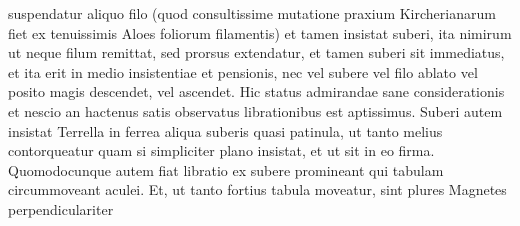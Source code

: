 suspendatur aliquo filo (quod consultissime mutatione praxium Kircherianarum fiet ex tenuissimis Aloes foliorum filamentis) et tamen insistat suberi, ita nimirum ut neque filum remittat, sed prorsus extendatur, et tamen suberi sit immediatus, et ita erit in medio insistentiae et pensionis, nec vel subere vel filo ablato vel posito magis descendet, vel ascendet. Hic status admirandae sane considerationis et nescio an hactenus satis observatus librationibus est aptissimus. Suberi autem insistat Terrella in ferrea aliqua suberis quasi patinula, ut tanto melius contorqueatur quam si simpliciter plano insistat, et ut sit in eo firma. Quomodocunque autem fiat libratio ex subere promineant qui tabulam circummoveant aculei. Et, ut tanto fortius tabula moveatur, sint plures Magnetes\protect{} perpendiculariter 